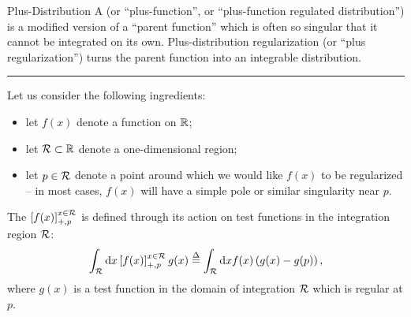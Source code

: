 \begin{subappendices}
\begin{definitionbox}{
Plus-Distribution
}{}
    A  (or ``plus-function'', or ``plus-function regulated distribution'') is a modified version of a ``parent function'' which is often so singular that it cannot be integrated on its own.
    Plus-distribution regularization (or ``plus regularization'') turns the parent function into an integrable distribution.

    \vspace{7pt}
    \hrule
    \vspace{7pt}

    Let us consider the following ingredients:
    \begin{itemize}
        \item
            let \(f(x)\) denote a function on \(\mathbb R\);
        \item
            let \(\mathcal{R} \subset \mathbb R\) denote a one-dimensional region;

        \item
            let \(p \in \mathcal{R}\) denote a point around which we would like \(f(x)\) to be regularized -- in most cases, \(f(x)\) will have a simple pole or similar singularity near \(p\).
    \end{itemize}

    The  \(\left[f(x)\right]_{+,p}^{x \in \mathcal{R}}\) is defined through its action on test functions in the integration region \(\mathcal{R}\):
    \begin{equation}
        \int_{\mathcal{R}} \dd x\left[f(x)\right]_{+,p}^{x \in \mathcal{R}} g(x) \overset{\Delta}{=} \int_{\mathcal{R}} \dd x f(x) \left(g(x) - g(p)\right)
        ,
    \end{equation}
    where \(g(x)\) is a test function in the domain of integration \(\mathcal{R}\) which is regular at \(p\).
\end{definitionbox}




\end{subappendices}

